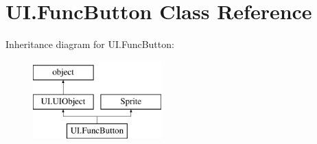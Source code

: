 \hypertarget{classUI_1_1FuncButton}{\section{U\-I.\-Func\-Button Class Reference}
\label{classUI_1_1FuncButton}
}
Inheritance diagram for U\-I.\-Func\-Button\-:\begin{figure}[H]
\begin{center}
\leavevmode
\includegraphics[height=3.000000cm]{classUI_1_1FuncButton}
\end{center}
\end{figure}
